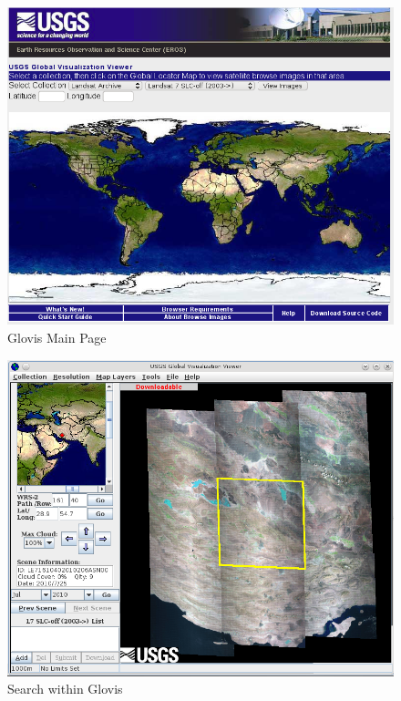 \begin{figure}[htbp]
   \centering
   \includegraphics[scale=0.4]{gipe001.png}
   \caption{Glovis Main Page}
   \label{fig:gipe001}
\end{figure}

\begin{figure}[htbp]
   \centering
   \includegraphics[scale=0.35]{gipe002.png}
   \caption{Search within Glovis}
   \label{fig:gipe002}
\end{figure}

